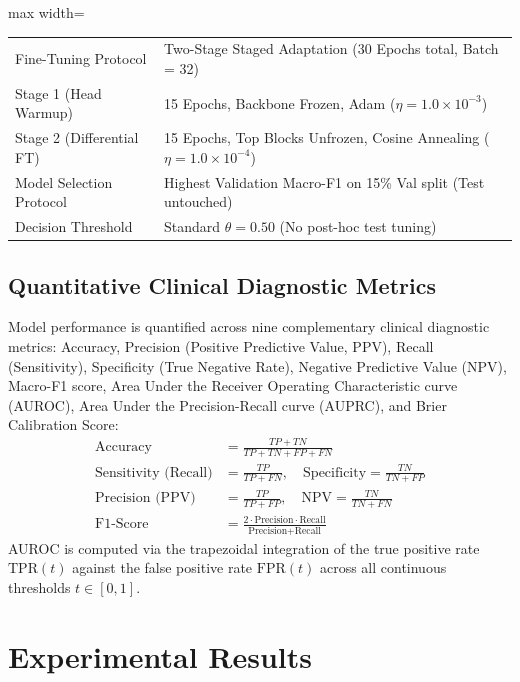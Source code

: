 \documentclass[journal,article,submit,moreauthors,pdftex]{Definitions/tsp}
\begin{document}
\begin{table}[htbp]
\begin{threeparttable}
\begin{adjustbox}{max width=\columnwidth}
\begin{tabular}{p{3.2cm} p{4.8cm}}
Fine-Tuning Protocol & Two-Stage Staged Adaptation (30 Epochs total, Batch = 32) \\
Stage 1 (Head Warmup) & 15 Epochs, Backbone Frozen, Adam ($\eta = 1.0 \times 10^{-3}$) \\
Stage 2 (Differential FT) & 15 Epochs, Top Blocks Unfrozen, Cosine Annealing ($\eta = 1.0 \times 10^{-4}$) \\
Model Selection Protocol & Highest Validation Macro-F1 on 15\% Val split (Test untouched) \\
Decision Threshold & Standard $\theta = 0.50$ (No post-hoc test tuning) \\
\bottomrule
\end{tabular}
\end{adjustbox}
\end{threeparttable}
\end{table}

\subsection{Quantitative Clinical Diagnostic Metrics} \label{sect:s3dot8}
Model performance is quantified across nine complementary clinical diagnostic metrics: Accuracy, Precision (Positive Predictive Value, PPV), Recall (Sensitivity), Specificity (True Negative Rate), Negative Predictive Value (NPV), Macro-F1 score, Area Under the Receiver Operating Characteristic curve (AUROC), Area Under the Precision-Recall curve (AUPRC), and Brier Calibration Score:
\begin{align}
\text{Accuracy} &= \frac{TP + TN}{TP + TN + FP + FN} \\
\text{Sensitivity (Recall)} &= \frac{TP}{TP + FN}, \quad \text{Specificity} = \frac{TN}{TN + FP} \\
\text{Precision (PPV)} &= \frac{TP}{TP + FP}, \quad \text{NPV} = \frac{TN}{TN + FN} \\
\text{F1-Score} &= \frac{2 \cdot \text{Precision} \cdot \text{Recall}}{\text{Precision} + \text{Recall}}
\end{align}
AUROC is computed via the trapezoidal integration of the true positive rate $\text{TPR}(t)$ against the false positive rate $\text{FPR}(t)$ across all continuous thresholds $t \in [0, 1]$.

\section{Experimental Results} \label{sect:s4}
\end{document}
